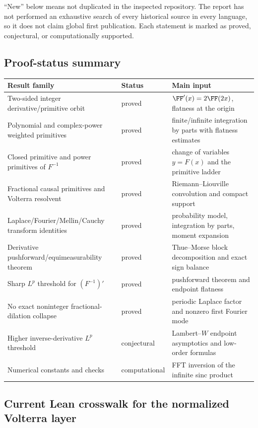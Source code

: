 \documentclass[11pt,oneside]{article}
\theoremstyle{definition}
\theoremstyle{remark}
\newcommand{\1}{\mathbf 1}
\begin{document}
\begin{remark}
``New'' below means not duplicated in the inspected repository.  The report has not
performed an exhaustive search of every historical source in every language, so it does
not claim global first publication.  Each statement is marked as proved, conjectural,
or computationally supported.
\end{remark}

\subsection{Proof-status summary}

\begin{longtable}{p{}p{}p{}}
\toprule
Result family & Status & Main input \\
\midrule
\endhead
Two-sided integer derivative/primitive orbit & proved &
\(\FF'(x)=2\FF(2x)\), flatness at the origin \\
Polynomial and complex-power weighted primitives & proved &
finite/infinite integration by parts with flatness estimates \\
Closed primitive and power primitives of \(F^{-1}\) & proved &
change of variables \(y=F(x)\) and the primitive ladder \\
Fractional causal primitives and Volterra resolvent & proved &
Riemann--Liouville convolution and compact support \\
Laplace/Fourier/Mellin/Cauchy transform identities & proved &
probability model, integration by parts, moment expansion \\
Derivative pushforward/equimeasurability theorem & proved &
Thue--Morse block decomposition and exact sign balance \\
Sharp \(L^p\) threshold for \((F^{-1})'\) & proved &
pushforward theorem and endpoint flatness \\
No exact noninteger fractional-dilation collapse & proved &
periodic Laplace factor and nonzero first Fourier mode \\
Higher inverse-derivative \(L^p\) threshold & conjectural &
Lambert--\(W\) endpoint asymptotics and low-order formulas \\
Numerical constants and checks & computational &
FFT inversion of the infinite sinc product \\
\bottomrule
\end{longtable}

\subsection{Current Lean crosswalk for the normalized Volterra layer}
\end{document}
